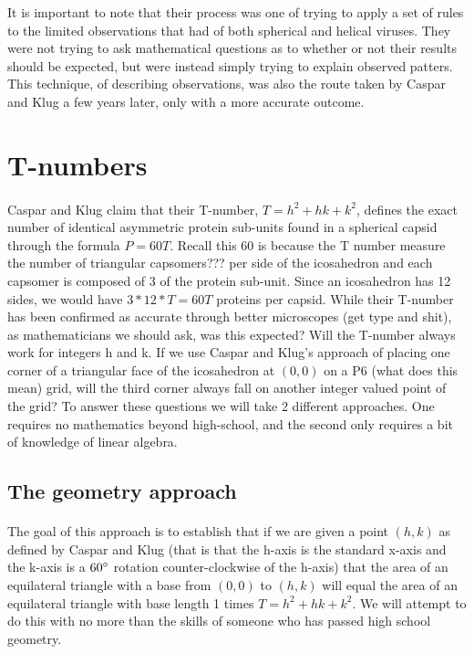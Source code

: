 \documentclass[12pt,letter]{article}
\begin{document}
It is important to note that their process was one of trying to apply a set of rules to the limited observations that had of both spherical and helical viruses. They were not trying to ask mathematical questions as to whether or not their results should be expected, but were instead simply trying to explain observed patters. This technique, of describing observations, was also the route taken by Caspar and Klug a few years later, only with a more accurate outcome.

\section{T-numbers}
\paragraph{}
Caspar and Klug claim that their T-number, $T = h^2 + hk + k^2$, defines the exact number of identical asymmetric protein sub-units found in a spherical capsid through the formula $P = 60T$. Recall this 60 is because the T number measure the number of triangular capsomers??? per side of the icosahedron and each capsomer is composed of 3 of the protein sub-unit. Since an icosahedron has 12 sides, we would have $3*12*T = 60T$ proteins per capsid. While their T-number has been confirmed as accurate through better microscopes (get type and shit), as mathematicians we should ask, was this expected? Will the T-number always work for integers h and k. If we use Caspar and Klug's approach of placing one corner of a triangular face of the icosahedron at $(0,0)$ on a P6 (what does this mean) grid, will the third corner always fall on another integer valued point of the grid? To answer these questions we will take 2 different approaches. One requires no mathematics beyond high-school, and the second only requires a bit of knowledge of linear algebra.

\subsection{The geometry approach}

\paragraph{}
The goal of this approach is to establish that if we are given a point $(h,k)$ as defined by Caspar and Klug (that is that the h-axis is the standard x-axis and the k-axis is a $60\degree$ rotation counter-clockwise of the h-axis) that the area of an equilateral triangle with a base from $(0,0)$ to $(h,k)$ will equal the area of an equilateral triangle with base length 1 times $T = h^2 + hk + k^2$. We will attempt to do this with no more than the skills of someone who has passed high school geometry. \\
\end{document}
